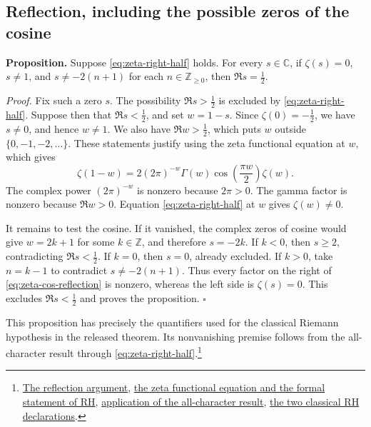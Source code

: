 \subsection{Reflection, including the possible zeros of the cosine}
\label{sec:zeta-reflection}

\noindent\textbf{Proposition.}
Suppose \eqref{eq:zeta-right-half} holds. For every \(s\in\mathbb C\),
if \(\zeta(s)=0\), \(s\ne1\), and \(s\ne-2(n+1)\) for each
\(n\in\mathbb Z_{\ge0}\), then \(\Re s=\tfrac12\).

\medskip
\noindent\textit{Proof.}
Fix such a zero \(s\). The possibility \(\Re s>\tfrac12\) is excluded
by \eqref{eq:zeta-right-half}. Suppose then that \(\Re s<\tfrac12\),
and set \(w=1-s\). Since \(\zeta(0)=-\tfrac12\), we have \(s\ne0\),
and hence \(w\ne1\). We also have \(\Re w>\tfrac12\), which puts
\(w\) outside \(\{0,-1,-2,\dots\}\). These statements justify using
the zeta functional equation at \(w\), which gives
\begin{equation}
\label{eq:zeta-cos-reflection}
    \zeta(1-w)=2(2\pi)^{-w}\Gamma(w)
                       \cos\!\left(\frac{\pi w}{2}\right)\zeta(w).
\end{equation}
The complex power \((2\pi)^{-w}\) is nonzero because \(2\pi>0\).
The gamma factor is nonzero because \(\Re w>0\). Equation
\eqref{eq:zeta-right-half} at \(w\) gives \(\zeta(w)\ne0\).

It remains to test the cosine. If it vanished, the complex zeros of
cosine would give \(w=2k+1\) for some \(k\in\mathbb Z\), and
therefore \(s=-2k\). If \(k<0\), then \(s\ge2\), contradicting
\(\Re s<\tfrac12\). If \(k=0\), then \(s=0\), already excluded.
If \(k>0\), take \(n=k-1\) to contradict \(s\ne-2(n+1)\).
Thus every factor on the right of \eqref{eq:zeta-cos-reflection} is
nonzero, whereas the left side is \(\zeta(s)=0\). This excludes
\(\Re s<\tfrac12\) and proves the proposition.
\hfill\(\square\)

This proposition has precisely the quantifiers used for the classical
Riemann hypothesis in the released theorem. Its nonvanishing premise
follows from the all-character result through
\eqref{eq:zeta-right-half}.\footnote{\href{https://github.com/Deicyde/riemann-hypothesis/blob/40e56bab/src/Formalism/GammaFactorNonvanishing/RhOfRight.lean\#L5-L62}{The reflection argument},
\href{https://github.com/leanprover-community/mathlib4/blob/v4.33.1/Mathlib/NumberTheory/LSeries/RiemannZeta.lean\#L175-L186}{the zeta functional equation and the formal statement of RH},
\href{https://github.com/Deicyde/riemann-hypothesis/blob/40e56bab/src/Supplements/Kernels/MainTheorems.lean\#L7-L9}{application of the all-character result},
\href{https://github.com/Deicyde/riemann-hypothesis/blob/40e56bab/src/Main.lean\#L4-L6}{the two classical RH declarations}.}

